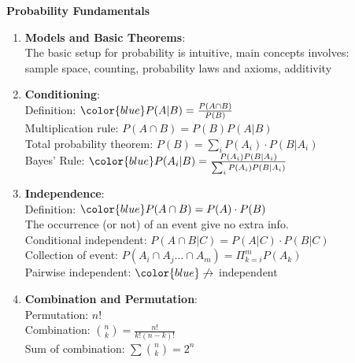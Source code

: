 \documentclass[10pt,landscape]{article}
\begin{document}
\newpage
\begin{multicols}{3}
\setlength{\premulticols}{1pt}
\setlength{\postmulticols}{1pt}
\setlength{\multicolsep}{1pt}
\setlength{\columnsep}{2pt}

\begin{center}
     \Large{\textbf{Probability Fundamentals}} \\
\end{center}

\begin{enumerate}
	\item \textbf{Models and Basic Theorems}: \\
			The basic setup for probability is intuitive, main concepts involves:\\
			sample space, counting, probability laws and axioms, additivity\\	
			
	\item \textbf{Conditioning}: \\
			Definition: $\color{blue} P(A|B) = \frac{P(A \cap B)}{P(B)}$\\
			
			Multiplication rule: $P(A \cap B) = P(B)P(A|B)$\\
			Total probability theorem: $P(B) = \sum_i P(A_i)\cdot P(B|A_i)$\\
			Bayes' Rule: $\color{blue} P(A_i|B) = \frac{P(A_i)P(B|A_i)}{\sum_i P(A_i)P(B|A_i)}$ \\
			
	
	\item \textbf{Independence}: \\
			Definition: $\color{blue} P(A\cap B) = P(A)\cdot P(B)$\\
			The occurrence (or not) of an event give no extra info.\\
			
			Conditional independent: $ P(A\cap B|C) = P(A|C)\cdot P(B|C)$\\
			Collection of event: $ P(A_i\cap A_j ... \cap A_m) = \Pi_{k=i}^m P(A_k)$\\
			Pairwise independent: $\color{blue}\not\rightarrow$ independent \\
			
			
				
	\item \textbf{Combination and Permutation}:\\
			Permutation: $n!$\\
			Combination: ${n \choose k} = \frac{n!}{k!(n-k)!}$\\
			Sum of combination: $\sum {n \choose k} = 2^n$\\


\end{enumerate}
\end{multicols}
\end{document}
